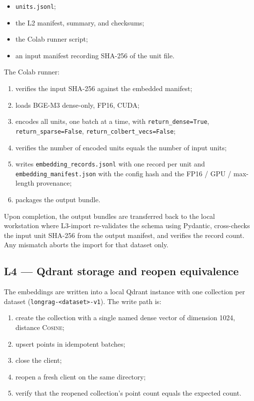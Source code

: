 \documentclass[11pt,a4paper]{article}
\begin{document}
\begin{itemize}[leftmargin=1.5em,itemsep=0.15em]
  \item \texttt{units.jsonl};
  \item the L2 manifest, summary, and checksums;
  \item the Colab runner script;
  \item an input manifest recording SHA-256 of the unit file.
\end{itemize}

The Colab runner:

\begin{enumerate}[leftmargin=1.5em,itemsep=0.15em]
  \item verifies the input SHA-256 against the embedded manifest;
  \item loads BGE-M3 dense-only, FP16, CUDA;
  \item encodes all units, one batch at a time, with
    \texttt{return\_dense=True}, \texttt{return\_sparse=False},
    \texttt{return\_colbert\_vecs=False};
  \item verifies the number of encoded units equals the number of
    input units;
  \item writes \texttt{embedding\_records.jsonl} with one record per
    unit and \texttt{embedding\_manifest.json} with the config hash
    and the FP16 / GPU / max-length provenance;
  \item packages the output bundle.
\end{enumerate}

Upon completion, the output bundles are transferred back to the
local workstation where L3-import re-validates the schema using
Pydantic, cross-checks the input unit SHA-256 from the output
manifest, and verifies the record count. Any mismatch aborts the
import for that dataset only.

\subsection{L4 --- Qdrant storage and reopen equivalence}
The embeddings are written into a local Qdrant instance with one
collection per dataset
(\texttt{longrag-<dataset>-v1}). The write path is:

\begin{enumerate}[leftmargin=1.5em,itemsep=0.15em]
  \item create the collection with a single named dense vector of
    dimension \num{1024}, distance \textsc{Cosine};
  \item upsert points in idempotent batches;
  \item close the client;
  \item reopen a fresh client on the same directory;
  \item verify that the reopened collection's point count equals the
    expected count.
\end{enumerate}
\end{document}
